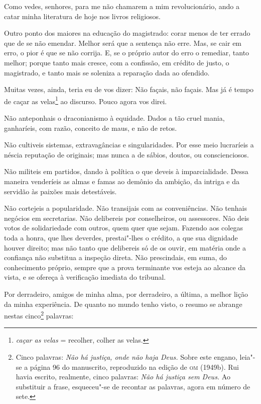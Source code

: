 Como vedes, senhores, para me não chamarem a mim revolucionário,
ando a catar minha literatura de hoje nos livros religiosos.

Outro ponto dos maiores na educação do magistrado: corar menos de
ter errado que de se não emendar. Melhor será que a sentença não erre.
Mas, se cair em erro, o pior é que se não corrija. E, se o próprio
autor do erro o remediar, tanto melhor; porque tanto mais cresce, com a
confissão, em crédito de justo, o magistrado, e tanto mais se soleniza
a reparação dada ao ofendido.

Muitas vezes, ainda, teria eu de vos dizer: Não façais, não
façais. Mas já é tempo de caçar as velas\footnote{ \textit{caçar as
velas} = recolher, colher as velas.} ao discurso. Pouco agora vos direi.

Não anteponhais o draconianismo à equidade. Dados a tão cruel
mania, ganharíeis, com razão, conceito de maus, e não de retos.

Não cultiveis sistemas, extravagâncias e singularidades. Por esse
meio lucraríeis a néscia reputação de originais; mas nunca a de sábios,
doutos, ou conscienciosos.

Não militeis em partidos, dando à política o que deveis à
imparcialidade. Dessa maneira venderíeis as almas e famas ao demônio da
ambição, da intriga e da servidão às paixões mais detestáveis.

Não cortejeis a popularidade. Não transijais com as conveniências.
Não tenhais negócios em secretarias. Não delibereis por conselheiros,
ou assessores. Não deis votos de solidariedade com outros, quem quer
que sejam. Fazendo aos colegas toda a honra, que lhes deverdes,
prestai"-lhes o crédito, a que sua dignidade houver direito; mas não
tanto que delibereis só de os ouvir, em matéria onde a confiança não
substitua a inspeção direta. Não prescindais, em suma, do conhecimento
próprio, sempre que a prova terminante vos esteja ao alcance da vista,
e se ofereça à verificação imediata do tribunal.

Por derradeiro, amigos de minha alma, por derradeiro, a última, a
melhor lição da minha experiência. De quanto no mundo tenho visto, o
resumo se abrange nestas cinco\footnote{ Cinco palavras: \textit{Não há
justiça, onde não haja Deus. } Sobre este engano, leia"-se a  página 96
do manuscrito, reproduzido na edição de \textsc{om} (1949b).  Rui havia
escrito, realmente, cinco palavras: \textit{ Não há justiça sem Deus.}
Ao substituir a frase, esqueceu"-se de recontar as palavras, agora em
número de sete.} palavras:

